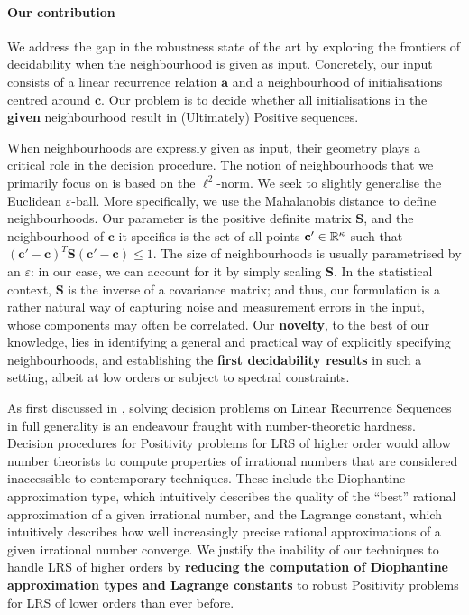 \paragraph*{Our contribution}
We address the gap in the robustness state of the art by exploring the frontiers of decidability when the neighbourhood is given as input. Concretely, our input consists of a linear recurrence relation $\mathbf{a}$ and a neighbourhood of initialisations centred around $\mathbf{c}$. Our problem is to decide whether all initialisations in the \textbf{given} neighbourhood result in (Ultimately) Positive sequences. 

When neighbourhoods are expressly given as input, their geometry plays a critical role in the decision procedure. The notion of neighbourhoods that we primarily focus on is based on the $\ell^2$-norm. We seek to slightly generalise the Euclidean $\varepsilon$-ball. More specifically, we use the Mahalanobis distance to define neighbourhoods. Our parameter is the positive definite matrix $\mathbf{S}$, and the neighbourhood of $\mathbf{c}$ it specifies is the set of all points $\mathbf{c'} \in \mathbb{R}^{\kappa}$ such that $(\mathbf{c'} - \mathbf{c})^T\mathbf{S}(\mathbf{c'} - \mathbf{c}) \le 1$. The size of neighbourhoods is usually parametrised by an $\varepsilon$: in our case, we can account for it by simply scaling $\mathbf{S}$. In the statistical context, $\mathbf{S}$ is the inverse of a covariance matrix; and thus, our formulation is a rather natural way of capturing noise and measurement errors in the input, whose components may often be correlated. Our \textbf{novelty}, to the best of our knowledge, lies in identifying a general and practical way of explicitly specifying neighbourhoods, and establishing the \textbf{first decidability results} in such a setting, albeit at low orders or subject to spectral constraints.

As first discussed in \cite[Section 5]{joeljames3}, solving decision problems on Linear Recurrence Sequences in full generality is an endeavour fraught with number-theoretic hardness. Decision procedures for Positivity problems for LRS of higher order would allow number theorists to compute properties of irrational numbers that are considered inaccessible to contemporary techniques. These include the Diophantine approximation type, which intuitively describes the quality of the ``best'' rational approximation of a given irrational number, and the Lagrange constant, which intuitively describes how well increasingly precise rational approximations of a given irrational number converge. We justify the inability of our techniques to handle LRS of higher orders by \textbf{reducing the computation of Diophantine approximation types and Lagrange constants} to robust Positivity problems for LRS of lower orders than ever before.

